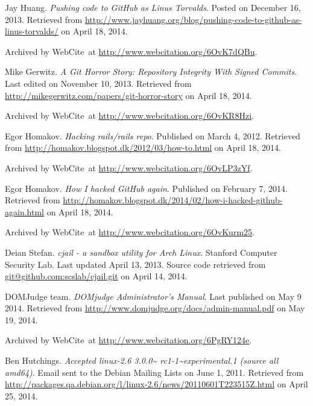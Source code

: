 \begin{thebibliography}{9}
Jay Huang. \emph{Pushing code to GitHub as Linus Torvalds}. Posted on December
16, 2013. Retrieved from
\url{http://www.jayhuang.org/blog/pushing-code-to-github-as-linus-torvalds/} on
April 18, 2014.

Archived by WebCite\textsuperscript{\textregistered}\ at
\url{http://www.webcitation.org/6OvK7dQBu}.


Mike Gerwitz. \emph{A Git Horror Story: Repository Integrity With Signed
Commits}. Last edited on November 10, 2013. Retrieved from
\url{http://mikegerwitz.com/papers/git-horror-story} on April 18, 2014.

Archived by WebCite\textsuperscript{\textregistered}\ at
\url{http://www.webcitation.org/6OvKR8Hzi}.


Egor Homakov. \emph{Hacking rails/rails repo}. Published on March 4, 2012.
Retrieved from \url{http://homakov.blogspot.dk/2012/03/how-to.html} on April
18, 2014.

Archived by WebCite\textsuperscript{\textregistered}\ at
\url{http://www.webcitation.org/6OvLP3zYf}.


Egor Homakov. \emph{How I hacked GitHub again}. Published on February 7, 2014.
Retrieved from
\url{http://homakov.blogspot.dk/2014/02/how-i-hacked-github-again.html} on
April 18, 2014.

Archived by WebCite\textsuperscript{\textregistered}\ at
\url{http://www.webcitation.org/6OvKurm25}.


Deian Stefan. \emph{cjail - a sandbox utility for Arch Linux}. Stanford
Computer Security Lab. Last updated April 13, 2013. Source code retrieved from
\url{git@github.com:scslab/cjail.git} on April 14, 2014.


DOMJudge team. \emph{DOMjudge Administrator's Manual}. Last published on May 9
2014. Retrieved from \url{http://www.domjudge.org/docs/admin-manual.pdf} on May
19, 2014.

Archived by WebCite\textsuperscript{\textregistered}\ at
\url{http://www.webcitation.org/6PgRY124e}.


Ben Hutchings. \emph{Accepted linux-2.6 3.0.0\textasciitilde
rc1-1\textasciitilde experimental.1 (source all amd64)}. Email sent to the
Debian Mailing Lists on June 1, 2011.  Retrieved from
\url{http://packages.qa.debian.org/l/linux-2.6/news/20110601T223515Z.html} on
April 25, 2014.


\end{thebibliography}
